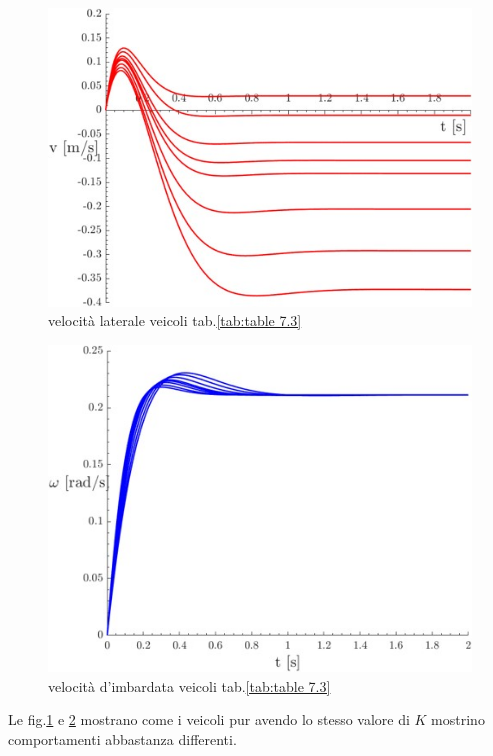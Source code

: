 \begin{figure}[!h]
    \centering
    \includegraphics[scale=0.6]{Immagini/Understeer Gradient/table manuel v.jpg}
    \caption{velocità laterale veicoli tab.\ref{tab:table 7.3}}
    \label{fig:table7.3 v}
\end{figure}

\begin{figure}[!h]
    \centering
    \includegraphics[scale=0.6]{Immagini/Understeer Gradient/table manuel r.jpg}
    \caption{velocità d'imbardata veicoli tab.\ref{tab:table 7.3}}
    \label{fig:table7.3 r}
\end{figure}
Le fig.\ref{fig:table7.3 v} e \ref{fig:table7.3 r} mostrano come i veicoli pur avendo lo stesso valore di $K$ mostrino
comportamenti abbastanza differenti.

